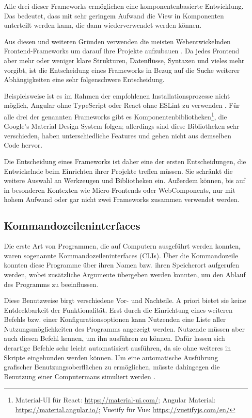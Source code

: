 Alle drei dieser Frameworks ermöglichen eine komponentenbasierte Entwicklung. Das bedeutet, dass mit sehr geringem Aufwand die View in Komponenten unterteilt werden kann, die dann wiederverwendet werden können.

Aus diesen und weiteren Gründen verwenden die meisten Webentwickelnden Frontend-Frameworks um darauf ihre Projekte aufzubauen \cite{stateofjs}. Da jedes Frontend aber mehr oder weniger klare Strukturen, Datenflüsse, Syntaxen und vieles mehr vorgibt, ist die Entscheidung eines Frameworks in Bezug auf die Suche weiterer Abhängigkeiten eine sehr folgenschwere Entscheidung.

Beispielsweise ist es im Rahmen der empfohlenen Installationsprozesse nicht möglich, Angular ohne TypeScript oder React ohne ESLint zu verwenden \cite{angular_only_with_typescript} \cite{react_eslint}. Für alle drei der genannten Frameworks gibt es Komponentenbibliotheken\footnote{Material-UI für React: \url{https://material-ui.com/}; Angular Material: \url{https://material.angular.io/}; Vuetify für Vue: \url{https://vuetifyjs.com/en/}}, die Google's Material Design System folgen; allerdings sind diese Bibliotheken sehr verschieden, haben unterschiedliche Features und gehen nicht aus demselben Code hervor.

Die Entscheidung eines Frameworks ist daher eine der ersten Entscheidungen, die Entwickelnde beim Einrichten ihrer Projekte treffen müssen. Sie schränkt die weitere Auswahl an Werkzeugen und Bibliotheken ein. Außerdem können, bis auf in besonderen Kontexten wie Micro-Frontends oder WebComponents, nur mit hohem Aufwand oder gar nicht zwei Frameworks zusammen verwendet werden.

\subsection{Kommandozeileninterfaces}
Die erste Art von Programmen, die auf Computern ausgeführt werden konnten, waren sogenannte Kommandozeileninterfaces (\gls{CLI}s). Über die Kommandozeile konnten diese Programme über ihren Namen bzw. ihren Speicherort aufgerufen werden, wobei zusätzliche Argumente übergeben werden konnten, um den Ablauf des Programms zu beeinflussen\cite{verma2013gracoli}.

Diese Benutzweise birgt verschiedene Vor- und Nachteile. A priori bietet sie keine Entdeckbarkeit der Funktionalität. Erst durch die Einrichtung eines weiteren Befehls bzw. einer Konfigurationsoptionen kann Nutzenden eine Liste aller Nutzungsmöglichkeiten des Programms angezeigt werden. Nutzende müssen aber auch diesen Befehl kennen, um ihn ausführen zu können. Dafür lassen sich derartige Befehle sehr leicht automatisiert ausführen, da sie ohne weiteres in Skripte eingebunden werden können. Um eine automatische Ausführung grafischer Benutzungsoberflächen zu ermöglichen, müsste dahingegen die Benutzung einer Computermaus simuliert werden \cite{fellmann2007command}.

